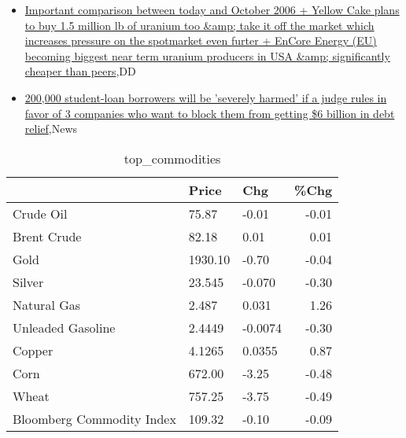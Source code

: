 \documentclass{article}%
\begin{document}
%
\begin{itemize}%
\item%
\href{https://reddit.com/r/Baystreetbets/comments/10shd0n/important\_comparison\_between\_today\_and\_october/}{Important comparison between today and October 2006 + Yellow Cake plans to buy 1.5 million lb of uranium too \&amp; take it off the market which increases pressure on the spotmarket even furter + EnCore Energy (EU) becoming biggest near term uranium producers in USA \&amp; significantly cheaper than peers},DD%
\item%
\href{https://reddit.com/r/Economics/comments/10sbtid/200000\_studentloan\_borrowers\_will\_be\_severely/}{200,000 student-loan borrowers will be 'severely harmed' if a judge rules in favor of 3 companies who want to block them from getting \$6 billion in debt relief},News%
\end{itemize}%


\begin{table}[htbp]%
\caption{top\_commodities}%
\centering%
\begin{adjustbox}{width=1\textwidth}%
\begin{tabular}{lllr}
\toprule
                          &   Price &     Chg &  \%Chg \\
\midrule
               Crude Oil  &   75.87 &   -0.01 & -0.01 \\
             Brent Crude  &   82.18 &    0.01 &  0.01 \\
                    Gold  & 1930.10 &   -0.70 & -0.04 \\
                  Silver  &  23.545 &  -0.070 & -0.30 \\
             Natural Gas  &   2.487 &   0.031 &  1.26 \\
       Unleaded Gasoline  &  2.4449 & -0.0074 & -0.30 \\
                  Copper  &  4.1265 &  0.0355 &  0.87 \\
                    Corn  &  672.00 &   -3.25 & -0.48 \\
                   Wheat  &  757.25 &   -3.75 & -0.49 \\
Bloomberg Commodity Index &  109.32 &   -0.10 & -0.09 \\
\bottomrule
\end{tabular}
%
\end{adjustbox}%
\end{table}

%
\end{document}
